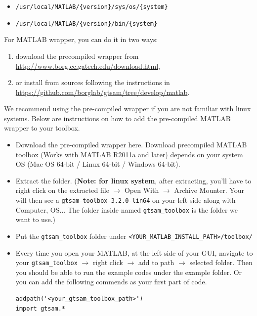 \documentclass[tp]{lcc}
\begin{document}
\begin{itemize}
    \item \lstinline[style=bash]|/usr/local/MATLAB/{version}/sys/os/{system}|
    \item \lstinline[style=bash]|/usr/local/MATLAB/{version}/bin/{system}|
\end{itemize}

For MATLAB wrapper, you can do it in two ways:

\begin{enumerate}
    \item download the precompiled wrapper from \url{http://www.borg.cc.gatech.edu/download.html},
    \item or install from sources following the instructions in \url{https://github.com/borglab/gtsam/tree/develop/matlab}.
\end{enumerate}

We recommend using the pre-compiled wrapper if you are not familiar with linux systems. Below are instructions on how to add the pre-compiled MATLAB wrapper to your toolbox.

\begin{itemize}
    \item Download the pre-compiled wrapper here. Download precompiled MATLAB toolbox (Works with MATLAB R2011a and later) depends on your system OS (Mac OS 64-bit / Linux 64-bit / Windows 64-bit).
    \item Extract the folder. (\textbf{Note: for linux system}, after extracting, you'll have to right click on the extracted file $\rightarrow$ Open With $\rightarrow$ Archive Mounter. Your will then see a \lstinline[style=bash]{gtsam-toolbox-3.2.0-lin64} on your left side along with Computer, OS... The folder inside named \lstinline[style=bash]{gtsam_toolbox} is the folder we want to use.)
    \item Put the \lstinline[style=bash]{gtsam_toolbox} folder under \lstinline[style=bash]{<YOUR_MATLAB_INSTALL_PATH>/toolbox/}
    \item Every time you open your MATLAB, at the left side of your GUI, navigate to your \lstinline[style=bash]{gtsam_toolbox} $\rightarrow$ right click $\rightarrow$ add to path $\rightarrow$ selected folder. Then you should be able to run the example codes under the example folder. Or you can add the following commends as your first part of code.
    \begin{lstlisting}[style=bash]
addpath('<your_gtsam_toolbox_path>')
import gtsam.*
    \end{lstlisting}
\end{itemize}
\end{document}
